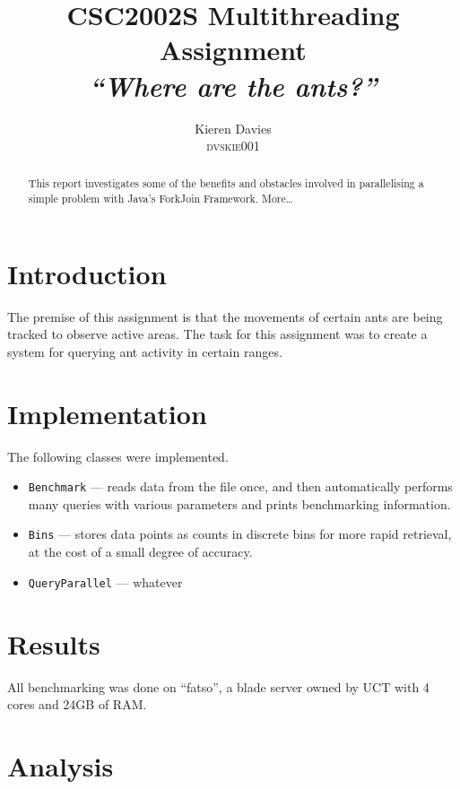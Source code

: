 \documentclass[a4paper,12pt]{article}
\begin{document}
\title{CSC2002S Multithreading Assignment \\
       \emph{``Where are the ants?''}}
\author{Kieren Davies \\
        \textsc{dvskie001}}
\date{}
\maketitle

\begin{abstract}
This report investigates some of the benefits and obstacles involved in parallelising a simple problem with Java's ForkJoin Framework.  More\dots
\end{abstract}

\newpage

\section{Introduction}

The premise of this assignment is that the movements of certain ants are being tracked to observe active areas.
The task for this assignment was to create a system for querying ant activity in certain ranges.

\section{Implementation}

The following classes were implemented.

\begin{itemize}
	\item \texttt{Benchmark} --- reads data from the file once, and then automatically performs many queries with various parameters and prints benchmarking information.
	\item \texttt{Bins} --- stores data points as counts in discrete bins for more rapid retrieval, at the cost of a small degree of accuracy.
	\item \texttt{QueryParallel} --- whatever
\end{itemize}

\section{Results}

All benchmarking was done on ``fatso'', a blade server owned by UCT with 4 cores and 24GB of RAM.

\section{Analysis}
\end{document}
